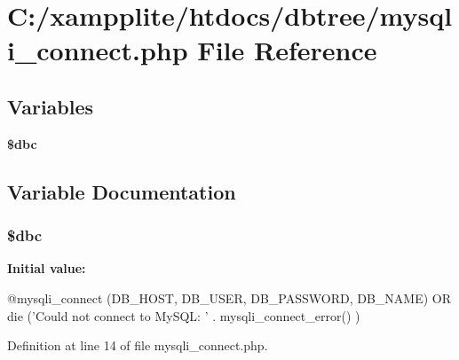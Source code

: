 \section{C:/xampplite/htdocs/dbtree/mysqli\_\-connect.php File Reference}
\label{mysqli__connect_8php}
\subsection*{Variables}
\begin{DoxyCompactItemize}
\item 
{\bf \$dbc}
\end{DoxyCompactItemize}


\subsection{Variable Documentation}
\subsubsection[{\$dbc}]{\setlength{\rightskip}{0pt plus 5cm}\$dbc}\label{mysqli__connect_8php_a5e2ec5d191cdc6b67e517d9f092a9177}
{\bfseries Initial value:}
\begin{DoxyCode}
 @mysqli_connect (DB_HOST, DB_USER, DB_PASSWORD, DB_NAME)
       OR die ('Could not connect to MySQL: ' . mysqli_connect_error() )
\end{DoxyCode}


Definition at line 14 of file mysqli\_\-connect.php.